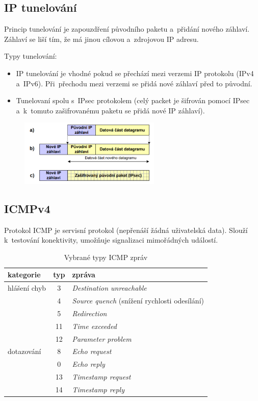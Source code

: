 \subsection{IP tunelování}

Princip tunelování je zapouzdření původního paketu a~přidání nového záhlaví.
Záhlaví se liší tím, že má jinou cílovou a~zdrojovou IP adresu.

Typy tunelování:
\begin{itemize}[noitemsep]
    \item IP tunelování je vhodné pokud se přechází mezi verzemi IP protokolu (IPv4 a~IPv6). Při~přechodu mezi verzemi se přidá nové záhlaví před to původní.
    \item Tunelovaní spolu s~IPsec protokolem (celý packet je šifrován pomocí IPsec a~k~tomuto zašifrovanému paketu se přidá nové IP záhlaví).
\end{itemize}

\begin{figure}[!h]
    \centering
    \includegraphics[width=0.6\textwidth]{obrazky/021.png}
\end{figure}


\subsection{ICMPv4}

Protokol ICMP je servisní protokol (nepřenáší žádná uživatelská data). Slouží k~testování konektivity, umožňuje signalizaci mimořádných událostí.

\begin{table}[ht]
	\centering
	\caption{Vybrané typy ICMP zpráv}
	\begin{tabular}{|l|c|l|}
		\hline
		kategorie    & typ & zpráva \\\hline\hline
		hlášení chyb & 3   & \emph{Destination unreachable} \\
		             & 4   & \emph{Source quench} (snížení rychlosti odesílání) \\
		             & 5   & \emph{Redirection} \\
		             & 11  & \emph{Time exceeded} \\
		             & 12  & \emph{Parameter problem} \\
		\hline
		dotazování   & 8   & \emph{Echo request} \\
		             & 0   & \emph{Echo reply} \\
		             & 13  & \emph{Timestamp request} \\
		             & 14  & \emph{Timestamp reply} \\
		\hline
	\end{tabular}
\end{table}



